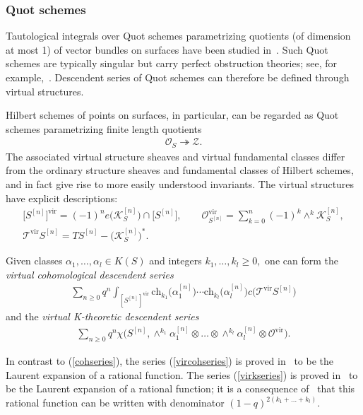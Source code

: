 \documentclass[10pt,a4paper]{amsart}
\numberwithin{equation}{section}
\def\O{\mathcal{O}}
\newcommand{\vir}{\mathrm{vir}}
\newcommand{\ch}{\mathrm{ch}}
\begin{document}
\subsubsection{Quot schemes}
Tautological integrals over Quot schemes
parametrizing quotients (of dimension at most 1) of vector bundles on surfaces have been studied in~\cite{AJLOP,B2,B1,JOP,St1,St2}. Such Quot schemes are typically singular but carry perfect obstruction theories; see, for example,~\cite[Section~4]{St2}. Descendent series of Quot schemes can therefore be defined through virtual structures.

Hilbert schemes of points on surfaces, in particular, can be regarded as Quot schemes parametrizing finite length quotients
\begin{gather*}
\O_{S}\twoheadrightarrow \mathcal{Z}.
\end{gather*}
The associated virtual structure sheaves and virtual fundamental classes differ from the ordinary structure sheaves and fundamental classes of Hilbert schemes, and in fact give rise to more easily understood invariants. The virtual structures have explicit descriptions:
\begin{gather*}
\big[S^{[n]}\big]^{\vir}=(-1)^{n} e\big(\mathcal{K}_S^{[n]}\big)\cap \big[S^{[n]}\big],\qquad
\O^{\vir}_{S^{[n]}}=\sum_{k=0}^{n} (-1)^{k} \wedge^{k} \mathcal{K}_S^{[n]},\\ \mathcal{T}^{\vir}S^{[n]}=TS^{[n]}-\big(\mathcal{K}_S^{[n]}\big)^{*}.
\end{gather*}

Given classes $\alpha_1,\dots,\alpha_l\in K(S)$ and integers $k_1,\dots,k_l\geq 0,$ one can form the {\em virtual cohomological descendent series}
\begin{align}\label{vircohseries}
\sum_{n\geq 0} q^n\int_{[S^{[n]}]^{\vir}} \ch_{k_1}\big(\alpha_1^{[n]}\big)\cdots \ch_{k_l}\big(\alpha_l^{[n]}\big) c\big(\mathcal{T}^{\vir}S^{[n]}\big)
\end{align}
and the {\em virtual K-theoretic descendent series}
\begin{align}\label{virkseries}
\sum_{n \geq 0} q^n \chi\big(S^{[n]}, \wedge^{k_1} \alpha^{[n]}_1\otimes \dots\otimes \wedge^{k_l} \alpha^{[n]}_l\otimes \mathcal{O}^{\vir}\big).
\end{align}

In contrast to (\ref{cohseries}), the series (\ref{vircohseries}) is proved in~\cite[Theorem~2]{JOP} to be the Laurent expansion of a rational function. The series (\ref{virkseries}) is proved in~\cite[Theorem~1]{AJLOP} to be the Laurent expansion of a rational function; it is a consequence of~\cite[Theorem~4]{AJLOP} that this rational function can be written with denominator $(1-q)^{2(k_1+\dots+k_l)}$.
\end{document}
